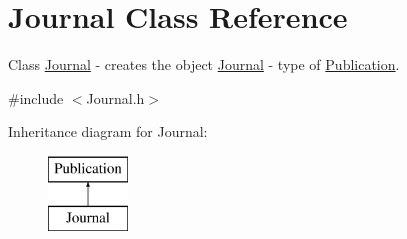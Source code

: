 \hypertarget{class_journal}{}\section{Journal Class Reference}
\label{class_journal}


Class \hyperlink{class_journal}{Journal} -\/ creates the object \hyperlink{class_journal}{Journal} -\/ type of \hyperlink{class_publication}{Publication}.  




{\ttfamily \#include $<$Journal.\+h$>$}

Inheritance diagram for Journal\+:\begin{figure}[H]
\begin{center}
\leavevmode
\includegraphics[height=2.000000cm]{class_journal}
\end{center}
\end{figure}
